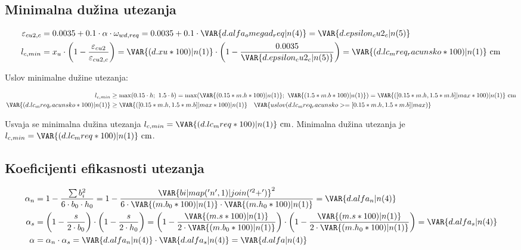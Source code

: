 \subsection{Minimalna dužina utezanja}

\begin{align*}
\varepsilon_{cu2,c} &= 0.0035 + 0.1 \cdot \alpha \cdot \omega_{wd,req} = 0.0035 + 0.1 \cdot \VAR{d.alfa_omegad_req|n(4)} = \VAR{d.epsilon_cu2_c|n(5)} \\
l_{c,min} &= x_u \cdot \left(1 - \frac{\varepsilon_{cu2}}{\varepsilon_{cu2,c}}\right) = \VAR{(d.xu*100)|n(1)} \cdot \left(1 - \frac{0.0035}{\VAR{d.epsilon_cu2_c|n(5)}}\right) = \VAR{(d.lc_mreq_racunsko*100)|n(1)} \ \mathrm{cm}
\end{align*}

Uslov minimalne dužine utezanja:

\begin{align*}
l_{c,min} &\geq \max(0.15 \cdot h;\ 1.5 \cdot b) = \max(\VAR{(0.15*m.h*100)|n(1)};\ \VAR{(1.5*m.b*100)|n(1)}) = \VAR{([0.15*m.h, 1.5*m.b]|max*100)|n(1)} \ \mathrm{cm} \\
\VAR{(d.lc_mreq_racunsko*100)|n(1)} &\geq \VAR{([0.15*m.h, 1.5*m.b]|max*100)|n(1)} \quad \VAR{uslov(d.lc_mreq_racunsko >= [0.15*m.h, 1.5*m.b]|max)}
\end{align*}

Usvaja se minimalna dužina utezanja $l_{c,min} = \VAR{(d.lc_mreq*100)|n(1)} \ \mathrm{cm}$.
Minimalna dužina utezanja je $l_{c,min} = \VAR{(d.lc_mreq*100)|n(1)} \ \mathrm{cm}$.

\subsection{Koeficijenti efikasnosti utezanja}

\begin{align*}
\alpha_n &= 1 - \frac{\sum b_i^2}{6 \cdot b_0 \cdot h_0} = 1 - \frac{\VAR{bi|map('n', 1)|join('^2 + ')}^2}{6 \cdot \VAR{(m.b_0*100)|n(1)} \cdot \VAR{(m.h_0*100)|n(1)}} = \VAR{d.alfa_n|n(4)} \\
\alpha_s &= \left(1 - \frac{s}{2 \cdot b_0}\right) \cdot \left(1 - \frac{s}{2 \cdot h_0}\right) = \left(1 - \frac{\VAR{(m.s*100)|n(1)}}{2 \cdot \VAR{(m.b_0*100)|n(1)}}\right) \cdot \left(1 - \frac{\VAR{(m.s*100)|n(1)}}{2 \cdot \VAR{(m.h_0*100)|n(1)}}\right) = \VAR{d.alfa_s|n(4)} \\
\alpha &= \alpha_n \cdot \alpha_s = \VAR{d.alfa_n|n(4)} \cdot \VAR{d.alfa_s|n(4)} = \VAR{d.alfa|n(4)}
\end{align*}

